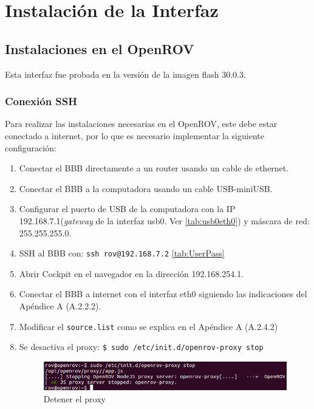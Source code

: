 \chapter{Instalación de la Interfaz}
\label{apendiceB}

\section{Instalaciones en el OpenROV}

Esta interfaz fue probada en la versión de la imagen flash 30.0.3.

\subsection{Conexión SSH}

Para realizar las instalaciones necesarias en el OpenROV, este debe estar conectado a internet, por lo que es necesario implementar la siguiente configuración:
\begin{enumerate}
    \item Conectar el BBB directamente a un router usando un cable de ethernet.
    \item Conectar el BBB a la computadora usando un cable USB-miniUSB.
    \item Configurar el puerto de USB de la computadora con la IP 192.168.7.1(\textit{gateway} de la interfaz usb0. Ver \ref{tab:usb0eth0}) y máscara de red: 255.255.255.0.
    \item SSH al BBB con: \verb|ssh rov@192.168.7.2| \ref{tab:UserPass}
    \item Abrir Cockpit en el navegador en la dirección 192.168.254.1.
    \item Conectar el BBB a internet con el interfaz eth0 siguiendo las indicaciones del Apéndice A (A.2.2.2).
    \item Modificar el \verb|source.list| como se explica en el Apéndice A (A.2.4.2)
    \item Se desactiva el proxy: \verb|$ sudo /etc/init.d/openrov-proxy stop|
    
        \begin{figure}[H]
            \centering
            \includegraphics[scale=0.70]{partes/ImgSophia/ApendiceB/detenerproxy.png}
            \caption{Detener el proxy}
            \label{fig:StopProxy}
        \end{figure}
\end{enumerate}

